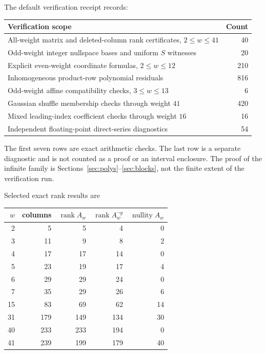 \documentclass[11pt,a4paper]{article}
\numberwithin{equation}{section}
\theoremstyle{definition}\newtheorem{definition}[theorem]{Definition}
\theoremstyle{remark}\newtheorem{remark}[theorem]{Remark}
\newcommand{\rank}{\operatorname{rank}}
\newcommand{\kerdim}{\operatorname{nullity}}
\begin{document}
The default verification receipt records:
\begin{center}
\begin{tabular}{@{}p{.76\linewidth}r@{}}
\toprule
Verification scope&Count\\\midrule
All-weight matrix and deleted-column rank certificates, $2\le w\le41$&40\\
Odd-weight integer nullspace bases and uniform $S$ witnesses&20\\
Explicit even-weight coordinate formulas, $2\le w\le12$&210\\
Inhomogeneous product-row polynomial residuals&816\\
Odd-weight affine compatibility checks, $3\le w\le13$&6\\
Gaussian shuffle membership checks through weight $41$&420\\
Mixed leading-index coefficient checks through weight $16$&16\\
Independent floating-point direct-series diagnostics&54\\\bottomrule
\end{tabular}
\end{center}
The first seven rows are exact arithmetic checks. The last row is a separate
diagnostic and is not counted as a proof or an interval enclosure. The proof
of the infinite family is Sections~\ref{sec:polys}--\ref{sec:blocks}, not the
finite extent of the verification run.

\begin{samepage}
Selected exact rank results are
\begin{center}
\begin{tabular}{@{}rrrrr@{}}
\toprule
$w$&columns&$\rank A_w$&$\rank A_w^{\neg g}$&$\kerdim A_w$\\\midrule
2&5&5&4&0\\
3&11&9&8&2\\
4&17&17&14&0\\
5&23&19&17&4\\
6&29&29&24&0\\
7&35&29&26&6\\
15&83&69&62&14\\
31&179&149&134&30\\
40&233&233&194&0\\
41&239&199&179&40\\\bottomrule
\end{tabular}
\end{center}
\end{samepage}
\end{document}
